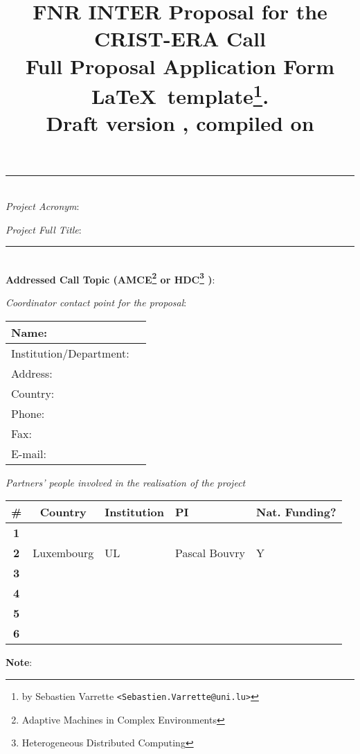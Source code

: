 \documentclass[11pt,twoside,a4paper]{article}
\title{\textbf{\Large FNR INTER Proposal for the CRIST-ERA Call} \\[1em]
  {\small Full Proposal Application Form \LaTeX\ template\thanks{by Sebastien
      Varrette {\small \texttt{<Sebastien.Varrette@uni.lu>}}}.\\
    \textbf{Draft version \docversion}, compiled on \isodayandtime}
}
\author{}
\date{}
\begin{document}
\maketitle
{\Large
  \begin{center}
      \hrule
      ~\\
      \emph{Project Acronym}: \project

      \emph{Project Full Title}: \fulltitle\\[1em]
  \end{center}
}
\hrule
~\\[2em]
\textbf{Addressed Call Topic (AMCE\footnote{Adaptive Machines in Complex Environments}  or HDC\footnote{Heterogeneous Distributed Computing} )}: 

\emph{Coordinator contact point for the proposal}:

\begin{table}[H]
    \centering\small
    \begin{tabular}{|p{}|p{}|}
        \hline
        Name:                   & \\\hline
        Institution/Department: & \\\hline
        Address:                & \\\hline
        Country:                & \\\hline
        Phone:                  & \\\hline
        Fax:                    & \\\hline
        E-mail:                 & \\\hline
        \hline
    \end{tabular}
\end{table}

\emph{Partners' people involved in the realisation of the project }

\begin{table}[H]
    \centering\small
    \begin{tabular}{|c|c|p{}|p{}|p{}|}
        \hline
        \rowcolor{lightgray}
        \textbf{\#} & \textbf{Country} & \textbf{Institution} & \textbf{PI} & \textbf{Nat. Funding?}\\\hline
        \hline 
        \textbf{1}  & & & &\\\hline
        \textbf{2}  & Luxembourg & \acf{UL} & Pascal Bouvry & Y \\\hline
        \textbf{3}  & & & &\\\hline
        \textbf{4}  & & & &\\\hline
        \textbf{5}  & & & &\\\hline
        \textbf{6}  & & & &\\\hline
        \hline
    \end{tabular}
\end{table}
\textbf{Note}:
\end{document}
